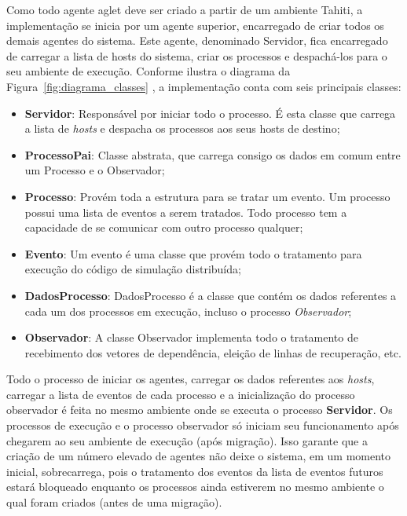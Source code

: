 Como todo agente aglet deve ser criado a partir de um ambiente Tahiti, a implementação se inicia por um agente superior, encarregado de criar todos os demais agentes do sistema. Este agente, denominado Servidor, fica encarregado de carregar a lista de hosts do sistema, criar os processos e despachá-los para o seu ambiente de execução. Conforme ilustra o diagrama da Figura~\ref{fig:diagrama_classes} , a implementação conta com seis principais classes:

\begin{itemize}
	\item \textbf{Servidor}: Responsável por iniciar todo o processo. É esta classe que carrega a lista de \textit{hosts} e despacha os processos aos seus hosts de destino;
	\item \textbf{ProcessoPai}: Classe abstrata, que carrega consigo os dados em comum entre um Processo e o Observador;
	\item \textbf{Processo}: Provém toda a estrutura para se tratar um evento. Um processo possui uma lista de eventos a serem tratados. Todo processo tem a capacidade de se comunicar com outro processo qualquer;
	\item \textbf{Evento}: Um evento é uma classe que provém todo o tratamento para execução do código de simulação distribuída;
	\item \textbf{DadosProcesso}: DadosProcesso é a classe que contém os dados referentes a cada  um dos processos em execução, incluso o processo \textit{Observador};
	\item \textbf{Observador}: A classe Observador implementa todo o tratamento de recebimento dos vetores de dependência, eleição de linhas de recuperação, etc.
\end{itemize}

Todo o processo de iniciar os agentes, carregar os dados referentes aos \textit{hosts}, carregar a lista de eventos de cada processo e a inicialização do processo observador é feita no mesmo ambiente onde se executa o processo \textbf{Servidor}. Os processos de execução e o processo observador só iniciam seu funcionamento após chegarem ao seu ambiente de execução (após migração). Isso garante que a criação de um número elevado de agentes não deixe o sistema, em um momento inicial, sobrecarrega, pois o tratamento dos eventos da lista de eventos futuros estará bloqueado enquanto os processos ainda estiverem no mesmo ambiente o qual foram criados (antes de uma migração).

